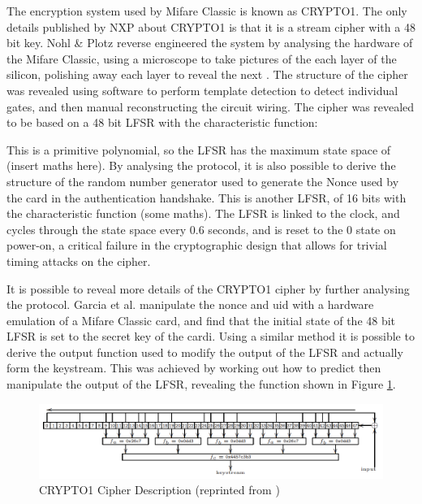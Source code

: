 \documentclass[pdflatex, a4paper,12pt]{article}
\begin{document}
The encryption system used by Mifare Classic is known as CRYPTO1. The only
details published by NXP about CRYPTO1 is that it is a stream cipher with a
48 bit key. Nohl \& Plotz reverse engineered the system by analysing the
hardware of the Mifare Classic, using a microscope to take pictures of the
each layer of the silicon, polishing away each layer to reveal the next
\cite{nohl_reverse-engineering_????}. The
structure of the cipher was revealed using software to perform template
detection to detect individual gates, and then manual reconstructing the circuit
wiring. The cipher was revealed to be based on a 48 bit LFSR with the
characteristic function:


This is a primitive polynomial, so the LFSR has the maximum state space of
(insert maths here). By analysing the protocol, it is also possible to derive
the structure of the random number generator used to generate the Nonce used by
the card in the authentication handshake. This is another LFSR, of 16 bits with
the characteristic function (some maths). The LFSR is linked to the clock, and
cycles through the state space every 0.6 seconds, and is reset to the 0 state on
power-on, a critical failure in the cryptographic design that allows for trivial
timing attacks on the cipher.

It is possible to reveal more details of the CRYPTO1 cipher by further
analysing the protocol. Garcia et al. manipulate the nonce and uid with a
hardware emulation of a Mifare Classic card, and find that the initial state of
the 48 bit LFSR is set to the secret key of the cardi\cite{garcia_dismantling_2008}.
Using a similar method it
is possible to derive the output function used to modify the output of the LFSR and
actually form the keystream. This was achieved by working out how to predict
then manipulate the output of the LFSR, revealing the function shown in Figure
\ref{fig:crypto1}.

\begin{figure}[htb]
\centering
\includegraphics[width=\textwidth]{img/crypto1.png}
\caption{CRYPTO1 Cipher Description (reprinted from
\protect\cite{garcia_dismantling_2008})}
\label{fig:crypto1}
\end{figure}
\end{document}
